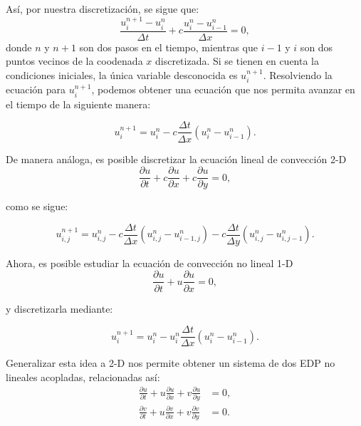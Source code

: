 \documentclass[A4,11pt]{article}
\begin{document}
\begin{multicols}{2}
Así, por nuestra discretización, se sigue que:
$$\frac{u_i^{n+1}-u_i^n}{\Delta t} + c \frac{u_i^n - u_{i-1}^n}{\Delta x} = 0, $$
donde $n$ y $n+1$ son dos pasos en el tiempo, mientras que $i-1$ y $i$ son dos puntos vecinos de la coodenada $x$ discretizada. Si se tienen en cuenta la condiciones iniciales, la única variable desconocida es $u_i^{n+1}$. Resolviendo la ecuación para $u_i^{n+1}$, podemos obtener una ecuación que nos permita avanzar en el tiempo de la siguiente manera: 
\begin{tiny}
\begin{equation}
	\label{decl}
	u_i^{n+1} = u_i^n - c \frac{\Delta t}{\Delta x}(u_i^n-u_{i-1}^n).
\end{equation}
\end{tiny}
De manera análoga, es posible discretizar la ecuación lineal de convección 2-D
\begin{equation}
	\label{ecl2d}
	\frac{\partial u}{\partial t}+c\frac{\partial u}{\partial x} + c\frac{\partial u}{\partial y} = 0,
\end{equation}

como se sigue:
\begin{tiny}
\begin{equation}
	\label{decl2d}
	u_{i,j}^{n+1} = u_{i,j}^n-c \frac{\Delta t}{\Delta x}(u_{i,j}^n-u_{i-1,j}^n)-c \frac{\Delta t}{\Delta y}(u_{i,j}^n-u_{i,j-1}^n).
\end{equation}	
\end{tiny}

Ahora, es posible estudiar la ecuación de convección no lineal 1-D 
\begin{equation}
	\label{ecnl}
	\frac{\partial u}{\partial t} + u \frac{\partial u}{\partial x} = 0,
\end{equation}

y discretizarla mediante:

\begin{tiny}
\begin{equation}
	\label{decnl}
	u_i^{n+1} = u_i^n - u_i^n \frac{\Delta t}{\Delta x} (u_i^n - u_{i-1}^n).
\end{equation}
	
\end{tiny}

Generalizar esta idea a 2-D nos permite obtener un sistema de dos EDP no lineales acopladas, relacionadas así:
\begin{equation}
	\label{ecnl2d}
	\begin{split}
		\frac{\partial u}{\partial t} + u \frac{\partial u}{\partial x} + v \frac{\partial u}{\partial y} &= 0,\\	
		\frac{\partial v}{\partial t} + u \frac{\partial v}{\partial x} + v \frac{\partial v}{\partial y} &= 0.
	\end{split}
\end{equation}



\end{multicols}
\end{document}
